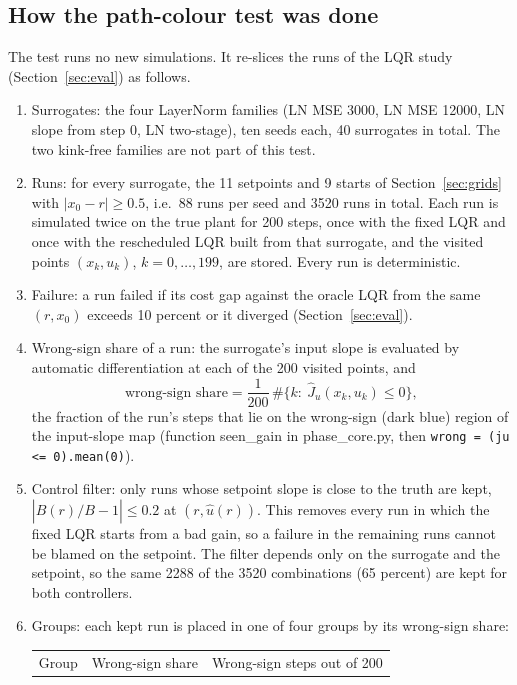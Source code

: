 \documentclass[11pt]{article}
\begin{document}
\subsection{How the path-colour test was done}
The test runs no new simulations. It re-slices the runs of the LQR study (Section~\ref{sec:eval}) as follows.
\begin{enumerate}
\item Surrogates: the four LayerNorm families (LN MSE 3000, LN MSE 12000, LN slope from step 0, LN two-stage), ten seeds each, 40 surrogates in total. The two kink-free families are not part of this test.
\item Runs: for every surrogate, the 11 setpoints and 9 starts of Section~\ref{sec:grids} with $|x_0-r|\ge0.5$, i.e.\ 88 runs per seed and 3520 runs in total. Each run is simulated twice on the true plant for 200 steps, once with the fixed LQR and once with the rescheduled LQR built from that surrogate, and the visited points $(x_k,u_k)$, $k=0,\dots,199$, are stored. Every run is deterministic.
\item Failure: a run failed if its cost gap against the oracle LQR from the same $(r,x_0)$ exceeds 10 percent or it diverged (Section~\ref{sec:eval}).
\item Wrong-sign share of a run: the surrogate's input slope is evaluated by automatic differentiation at each of the 200 visited points, and
\begin{equation}
\text{wrong-sign share} = \frac{1}{200}\,\#\{k:\ \hat J_u(x_k,u_k)\le0\},
\end{equation}
the fraction of the run's steps that lie on the wrong-sign (dark blue) region of the input-slope map (function seen\_gain in phase\_core.py, then \texttt{wrong = (ju <= 0).mean(0)}).
\item Control filter: only runs whose setpoint slope is close to the truth are kept, $|\hat B(r)/B-1|\le0.2$ at $(r,\hat u(r))$. This removes every run in which the fixed LQR starts from a bad gain, so a failure in the remaining runs cannot be blamed on the setpoint. The filter depends only on the surrogate and the setpoint, so the same 2288 of the 3520 combinations (65 percent) are kept for both controllers.
\item Groups: each kept run is placed in one of four groups by its wrong-sign share:
\begin{center}
\begin{tabular}{lll}
\toprule
Group & Wrong-sign share & Wrong-sign steps out of 200 \\

\end{tabular}
\end{center}
\end{enumerate}
\end{document}
